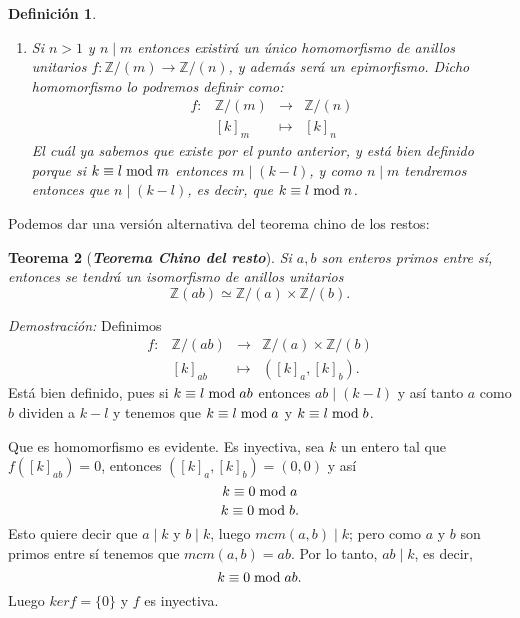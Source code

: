 \documentclass[12pt]{article}
\newtheorem{theorem}{Teorema}[section]
\newtheorem{definition}[theorem]{Definición}
\begin{document}
\begin{definition}
\begin{enumerate}
\item Si $n>1$ y $n\mid m$ entonces existirá un único homomorfismo de anillos unitarios $f \colon \mathbb{Z}/(m) \longrightarrow \mathbb{Z}/(n)$, y además será un epimorfismo. Dicho homomorfismo lo podremos definir como: $$\begin{array}{rccl}
f \colon &\mathbb{Z}/(m)&\longrightarrow &\mathbb{Z}/(n) \\
&[k]_{m}& \longmapsto &[k]_{n}
\end{array}
$$
El cuál ya sabemos que existe por el punto anterior, y está bien definido porque si $k \equiv l \hspace{0.1cm} \text{mod} \hspace{0.1cm} m$ entonces $m \mid (k-l)$, y como $n \mid m$ tendremos entonces que $n \mid (k-l)$, es decir, que $k \equiv l \hspace{0.1cm} \text{mod} \hspace{0.1cm} n$.
\end{enumerate}
\end{definition}

Podemos dar una versión alternativa del teorema chino de los restos:

\begin{theorem}[\textbf{\textit{Teorema Chino del resto}}]
Si $a,b$ son enteros primos entre sí, entonces se tendrá un isomorfismo de anillos unitarios $$\mathbb{Z}(ab) \simeq \mathbb{Z}/(a) \times \mathbb{Z}/(b).$$
\end{theorem}
\emph{Demostración: } Definimos $$\begin{array}{rccl}
f \colon &\mathbb{Z}/(ab)&\longrightarrow &\mathbb{Z}/(a) \times \mathbb{Z}/(b)\\
&[k]_{ab}& \longmapsto &([k]_{a}, [k]_{b}).
\end{array}
$$ Está bien definido, pues si $k \equiv l \hspace{0.1cm} \text{mod} \hspace{0.1cm} ab$ entonces $ab \mid (k-l)$ y así tanto $a$ como $b$ dividen a $k-l$ y tenemos que $k \equiv l \hspace{0.1cm} \text{mod} \hspace{0.1cm} a$ y $k \equiv l \hspace{0.1cm} \text{mod} \hspace{0.1cm} b$. 

Que es homomorfismo es evidente. Es inyectiva, sea $k$ un entero tal que $f([k]_{ab}) = 0$, entonces $([k]_{a}, [k]_{b}) = (0,0)$ y así $$k \equiv 0 \hspace{0.1cm} \text{mod} \hspace{0.1cm} a$$ $$k \equiv 0 \hspace{0.1cm} \text{mod} \hspace{0.1cm} b.$$ Esto quiere decir que $a \mid k$ y $b \mid k$, luego $mcm(a,b) \mid k$; pero como $a$ y $b$ son primos entre sí tenemos que $mcm(a,b) = ab$. Por lo tanto, $ab \mid k$, es decir, $$k \equiv 0 \hspace{0.1cm} \text{mod} \hspace{0.1cm} ab.$$ Luego $ker f = \lbrace 0 \rbrace$ y $f$ es  inyectiva.
\end{document}
